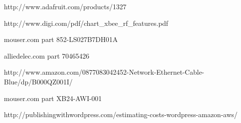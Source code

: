 \documentclass[PPFS.tex]{template/subfiles}
\begin{document}
\begin{thebibliography}{}
http://www.adafruit.com/products/1327

http://www.digi.com/pdf/chart\_xbee\_rf\_features.pdf

mouser.com part 852-LS027B7DH01A

alliedelec.com part 70465426 

http://www.amazon.com/0877083042452-Network-Ethernet-Cable-Blue/dp/B000QZ001I/

mouser.com part XB24-AWI-001

http://publishingwithwordpress.com/estimating-costs-wordpress-amazon-aws/

\end{thebibliography}
\end{document}
